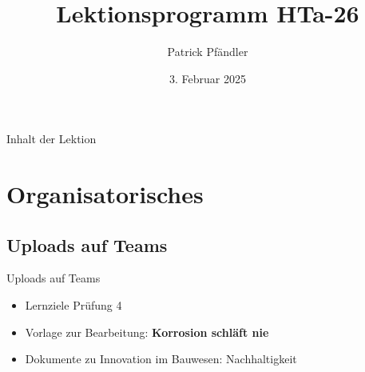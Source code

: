 

\def\customoptions{aspectratio=169} %



\title{\textbf{Lektionsprogramm HTa-26}}
\author{Patrick Pfändler}
\date{3. Februar 2025}




\frame{\titlepage}

\begin{frame}{Inhalt der Lektion}
	\tableofcontents
\end{frame}

\folieFragen

\section{Organisatorisches}
\BlueSectionSlide

\subsection{Uploads auf Teams}
\begin{frame}{Uploads auf Teams}
	\begin{itemize}
		\item[\textbullet] Lernziele Prüfung 4
		\item[\textbullet] Vorlage zur Bearbeitung: \textbf{Korrosion schläft nie}
		\item[\textbullet] Dokumente zu Innovation im Bauwesen: Nachhaltigkeit
	\end{itemize}

\end{frame}


